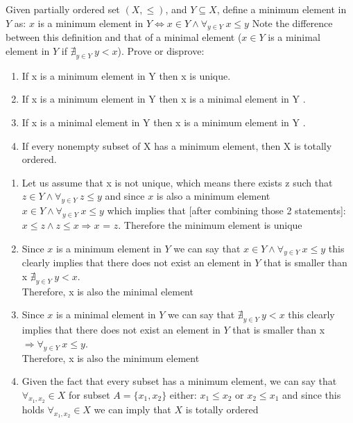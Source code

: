\documentclass[12pt]{article}
\newenvironment{solution}[2][Solution]{ \begin{trivlist}
\item[\hskip \labelsep {\bfseries #1}]}{\end{trivlist}}
\newenvironment{problem}[2][Problem]{\begin{trivlist}
\item[\hskip \labelsep {\bfseries #1}\hskip \labelsep {\bfseries #2.}]}{\end{trivlist}}
\begin{document}
\begin{problem}{11}Given partially ordered set $(X,\le)$, and $Y \subseteq X$, define a minimum element in $Y$ as:
\vskip 0.1in
$x$ is a minimum element in $Y \Leftrightarrow x \in Y \wedge \forall_{y \in Y}\ x \le y$
\vskip 0.1in
Note the difference between this definition and that of a minimal element ($x \in Y$ is a minimal element in $Y$ if  $\nexists_{y \in Y}\ y < x$). Prove or disprove:
\item[]
\begin{enumerate}[label=\alph*)]
    \item If x is a minimum element in Y then x is unique.
    \item If x is a minimum element in Y then x is a minimal element in Y .
    \item If x is a minimal element in Y then x is a minimum element in Y .
    \item If every nonempty subset of X has a minimum element, then X is totally ordered.
\end{enumerate}
\end{problem}
\begin{solution}{11}
\item[]
\begin{enumerate}[label=\alph*)]
    \item Let us assume that x is not unique, which means there exists z such that $z \in Y \wedge  \forall_{y \in Y}\ z \le y$ and since $x$ is also a minimum element $x \in Y \wedge \forall_{y \in Y}\ x \le y$ which implies that [after combining those 2 statements]: $x \le z \wedge z \le x \Rightarrow x$ = $z$. Therefore the minimum element is unique
    \item Since $x$ is a minimum element in $Y$ we can say that $ x \in Y \wedge \forall_{y \in Y}\ x \le y$ this clearly implies that there does not exist an element in $Y$ that is smaller than x $\nexists_{y \in Y}\ y < x$.\\ Therefore, x is also the minimal element
    \item Since $x$ is a minimal element in $Y$ we can say that $\nexists_{y \in Y}\ y < x$  this clearly implies that there does not exist an element in $Y$ that is smaller than x $ \Rightarrow \forall_{y \in Y}\ x \le y$.\\ Therefore, x is also the minimum element
    \item Given the fact that every subset has a minimum element, we can say that $\forall_{x_1,x_2} \in X$ for subset $A = \{x_1, x_2\}$ either: $x_1 \leq x_2$ or $x_2 \leq x_1$ and since this holds $\forall_{x_1,x_2} \in X$ we can imply that $X$ is totally ordered
\end{enumerate}
\end{solution}
\end{document}
